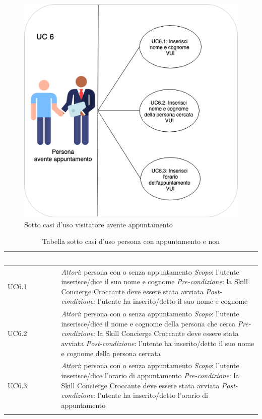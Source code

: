 \begin{figure}[H] 
    \centering 
    \includegraphics[width=0.7\columnwidth]{immagini/casi_duso2.png}
    \caption{\label{fig:attori}Sotto casi d'uso visitatore avente appuntamento}
\end{figure}
\begin{center}
	\centering
	\renewcommand{\arraystretch}{1.5}
	\begin{longtable}{  p{2.5cm} p{9.6cm} }
		\rowcolor{tableHead}
		\textbf{\textcolor{white}{Identificativo}} & \textbf{\textcolor{white}{Descrizione}} \\
		\endhead  
		
		UC6.1 &  \textit{Attori}: persona con o senza appuntamento \newline \textit{Scopo}: l'utente inserisce/dice il suo nome e cognome \newline \textit{Pre-condizione}: la Skill Concierge Croccante deve essere stata avviata \newline \textit{Post-condizione}: l'utente ha inserito/detto il suo nome e cognome \\
		
		UC6.2 &  \textit{Attori}: persona con o senza appuntamento \newline \textit{Scopo}: l'utente inserisce/dice il nome e cognome della persona che cerca \newline \textit{Pre-condizione}: la Skill Concierge Croccante deve essere stata avviata \newline \textit{Post-condizione}: l'utente ha inserito/detto il suo nome e cognome della persona cercata \\
		
		UC6.3 &  \textit{Attori}: persona con o senza appuntamento \newline \textit{Scopo}: l'utente inserisce/dice l'orario di appuntamento \newline \textit{Pre-condizione}: la Skill Concierge Croccante deve essere stata avviata \newline \textit{Post-condizione}: l'utente ha inserito/detto l'orario di appuntamento \\
		
		\rowcolor{white}
		\caption{Tabella sotto casi d'uso persona con appuntamento e non}
	\end{longtable}
\end{center}
